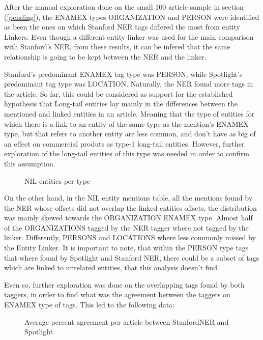 After the manual exploration done on the small 100 article sample in section (\ref{pending}),
the ENAMEX types ORGANIZATION and PERSON were identified as been the ones on which Stanford NER tags differed the most from entity Linkers.
Even though a different entity linker was used for the main comparison with Stanford's NER, from these results,
it can be infered that the same relationship is going to be kept between the NER and the linker.

Stanford's predominant ENAMEX tag type was PERSON, while Spotlight's predominant tag type was LOCATION.
Naturally, the NER found more tags in the article.
So far, this could be considered as support for the established hypothesis that Long-tail entities lay mainly in the differences between 
the mentioned and linked entities in an article.
Meaning that the type of entities for which there is a link to an entity of the same type as the mention's ENAMEX type, but that refers to another entity
are less common, and don't have as big of an effect on commercial produts as type-1 long-tail entities.
However, further exploration of the long-tail entities of this type was needed in order to confirm this assumption.

\begin{figure}[h]
  \label{fig:nilspertype}
  \centering
  \caption{NIL entities per type}
\end{figure}

On the other hand, in the NIL entity mentions table, all the mentions found by the NER whose offsets did not overlap the linked entities offsets,
the distribution was mainly skewed towards the ORGANIZATION ENAMEX type.
Almost half of the ORGANIZATIONS tagged by the NER tagger where not tagged by the linker.
Differently, PERSONS and LOCATIONS where less commonly missed by the Entity Linker.
It is important to note, that within the PERSON type tags that where found by Spotlight and Stanford NER, there could be a subset of tags which are linked to unrelated entities,
that this analysis doesn't find.

Even so, further exploration was done on the overlapping tags found by both taggers,
in order to find what was the agreement between the taggers on ENAMEX type of tags. 
This led to the following data:

\begin{figure}[h]
  \label{fig:avgagreementpercentnernel}
  \centering
  \caption{Average percent agreement per article between StanfordNER and Spotlight}
\end{figure}

